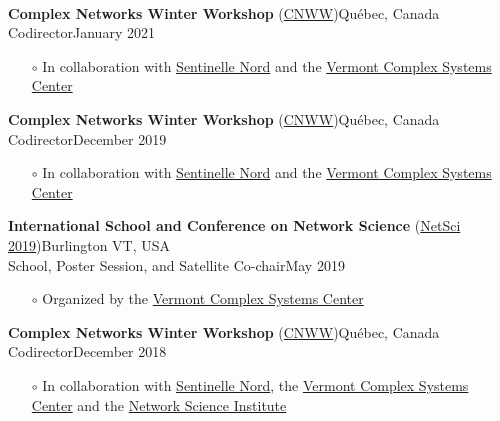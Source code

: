 \documentclass[11pt]{article}
\newcommand{\TitreSection}[1]{\colorbox{background}{\makebox[\textwidth-0.5em][c]{\Large\textrm{\textsc{#1}}}}\vspace{0.75\baselineskip}\\}
\begin{document}
%
%
%
%
%
\TitreSection{Organizing Activities}
%
%
\parbox{\textwidth}{\textbf{Complex Networks Winter Workshop} (\href{https://sentinellenord.ulaval.ca/fr/reseauxcomplexes2020}{CNWW})\hfill Qu\'ebec, Canada\\
Codirector\hfill January 2021
\begin{itemize}[leftmargin=1.5em]\small
  \item[$\circ$] In collaboration with \href{http://sentinellenord.ulaval.ca/}{Sentinelle Nord} and the \href{http://www.vermontcomplexsystems.org/}{Vermont Complex Systems Center}
\end{itemize}}
%
\parbox{\textwidth}{\textbf{Complex Networks Winter Workshop} (\href{https://sentinellenord.ulaval.ca/fr/reseauxcomplexes2019}{CNWW})\hfill Qu\'ebec, Canada\\
Codirector\hfill December 2019
\begin{itemize}[leftmargin=1.5em]\small
  \item[$\circ$] In collaboration with \href{http://sentinellenord.ulaval.ca/}{Sentinelle Nord} and the \href{http://www.vermontcomplexsystems.org/}{Vermont Complex Systems Center}
\end{itemize}}
%
\parbox{\textwidth}{\textbf{International School and Conference on Network Science} (\href{http://vermontcomplexsystems.org/events/netsci/}{NetSci 2019})\hfill Burlington VT, USA\\
School, Poster Session, and Satellite Co-chair\hfill May 2019
\begin{itemize}[leftmargin=1.5em]\small
  \item[$\circ$] Organized by the \href{http://www.vermontcomplexsystems.org/}{Vermont Complex Systems Center}
\end{itemize}}
%
\parbox{\textwidth}{\textbf{Complex Networks Winter Workshop} (\href{https://sentinellenord.ulaval.ca/fr/reseauxcomplexes2018}{CNWW})\hfill Qu\'ebec, Canada\\
Codirector\hfill December 2018
\begin{itemize}[leftmargin=1.5em]\small
  \item[$\circ$] In collaboration with \href{http://sentinellenord.ulaval.ca/}{Sentinelle Nord}, the \href{http://www.vermontcomplexsystems.org/}{Vermont Complex Systems Center} and the \href{https://www.networkscienceinstitute.org/}{Network Science Institute}
\end{itemize}}
\end{document}
